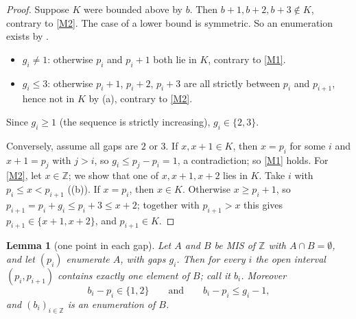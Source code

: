 \documentclass[11pt]{article}
\theoremstyle{plain}
\newtheorem{lemma}[lemma]{Lemma}
\theoremstyle{definition}
\theoremstyle{remark}
\newcommand{\Z}{\mathbb{Z}}
\begin{document}
\begin{proof}
Suppose $K$ were bounded above by $b$. Then $b+1, b+2, b+3 \notin K$, contrary to \ref{M2}.
The case of a lower bound is symmetric. So an enumeration exists by .
\begin{itemize}
  \item $g_i \ne 1$: otherwise $p_i$ and $p_i + 1$ both lie in $K$, contrary to \ref{M1}.
  \item $g_i \le 3$: otherwise $p_i + 1$, $p_i + 2$, $p_i + 3$ are all strictly between $p_i$
        and $p_{i+1}$, hence not in $K$ by (a), contrary to \ref{M2}.
\end{itemize}
Since $g_i \ge 1$ (the sequence is strictly increasing), $g_i \in \{2, 3\}$.

Conversely, assume all gaps are $2$ or $3$. If $x, x+1 \in K$, then $x = p_i$ for some $i$
and $x + 1 = p_j$ with $j > i$, so $g_i \le p_j - p_i = 1$, a contradiction; so \ref{M1}
holds. For \ref{M2}, let $x \in \Z$; we show that one of $x, x+1, x+2$ lies in $K$. Take $i$
with $p_i \le x < p_{i+1}$ ((b)). If $x = p_i$, then $x \in K$. Otherwise
$x \ge p_i + 1$, so $p_{i+1} = p_i + g_i \le p_i + 3 \le x + 2$; together with
$p_{i+1} > x$ this gives $p_{i+1} \in \{x+1, x+2\}$, and $p_{i+1} \in K$.
\end{proof}

\begin{lemma}[one point in each gap]\label{lem:one-per-gap}
Let $A$ and $B$ be MIS of $\Z$ with $A \cap B = \emptyset$, and let $(p_i)$ enumerate $A$, with
gaps $g_i$. Then for every $i$ the open interval $(p_i, p_{i+1})$ contains exactly one element
of $B$; call it $b_i$. Moreover
\[
b_i - p_i \in \{1, 2\} \qquad\text{and}\qquad b_i - p_i \le g_i - 1,
\]
and $(b_i)_{i \in \Z}$ is an enumeration of $B$.
\end{lemma}
\end{document}

